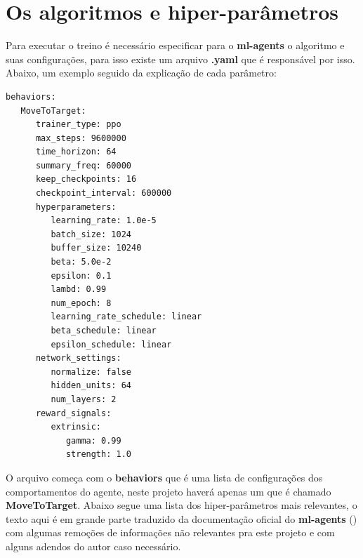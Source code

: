 \section{Os algoritmos e hiper-parâmetros}\label{algoritmos}
Para executar o treino é necessário especificar para o \textbf{ml-agents} o algoritmo e suas configurações, para isso existe um arquivo \textbf{.yaml} que é responsável por isso. Abaixo, um exemplo seguido da explicação de cada parâmetro:

\begin{lstlisting}
behaviors:
   MoveToTarget:
      trainer_type: ppo
      max_steps: 9600000
      time_horizon: 64
      summary_freq: 60000
      keep_checkpoints: 16     
      checkpoint_interval: 600000
      hyperparameters:
         learning_rate: 1.0e-5
         batch_size: 1024
         buffer_size: 10240
         beta: 5.0e-2
         epsilon: 0.1
         lambd: 0.99
         num_epoch: 8
         learning_rate_schedule: linear
         beta_schedule: linear
         epsilon_schedule: linear
      network_settings:
         normalize: false
         hidden_units: 64
         num_layers: 2
      reward_signals:
         extrinsic:
            gamma: 0.99
            strength: 1.0
\end{lstlisting}

O arquivo começa com o \textbf{behaviors} que é uma lista de configurações dos comportamentos do agente, neste projeto haverá apenas um que é chamado \textbf{MoveToTarget}. Abaixo segue uma lista dos hiper-parâmetros mais relevantes, o texto aqui é em grande parte traduzido da documentação oficial do \textbf{ml-agents} () com algumas remoções de informações não relevantes pra este projeto e com alguns adendos do autor caso necessário.

